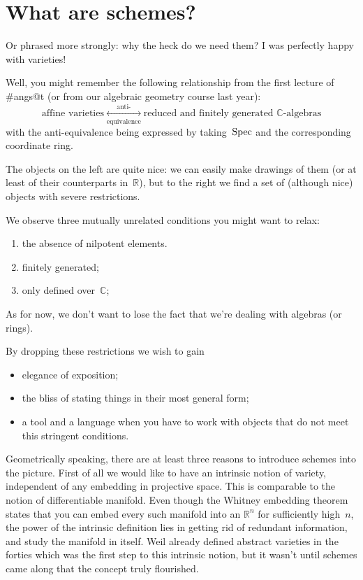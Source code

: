 \section{What are schemes?}

Or phrased more strongly: why the heck do we need them? I was perfectly happy with varieties!

Well, you might remember the following relationship from the first lecture of \#angs@t (or from our algebraic geometry course last year):
\begin{equation}
  \text{affine varieties} \underset{\text{equivalence}}{\overset{\text{anti-}}{\longleftrightarrow}} \text{reduced and finitely generated $\mathbb{C}$-algebras}
  \label{equation:variety-anti-equivalence}
\end{equation}
with the anti-equivalence being expressed by taking~$\operatorname{Spec}$ and the corresponding coordinate ring.

The objects on the left are quite nice: we can easily make drawings of them (or at least of their counterparts in~$\mathbb{R}$), but to the right we find a set of (although nice) objects with severe restrictions.

We observe three mutually unrelated conditions you might want to relax:
\begin{enumerate}
  \item the absence of nilpotent elements.
  \item finitely generated;
  \item only defined over~$\mathbb{C}$;
\end{enumerate}
As for now, we don't want to lose the fact that we're dealing with algebras (or rings).

By dropping these restrictions we wish to gain
\begin{itemize}
  \item elegance of exposition;
  \item the bliss of stating things in their most general form;
  \item a tool and a language when you have to work with objects that do not meet this stringent conditions.
\end{itemize}

Geometrically speaking, there are at least three reasons to introduce schemes into the picture. First of all we would like to have an intrinsic notion of variety, independent of any embedding in projective space. This is comparable to the notion of differentiable manifold. Even though the Whitney embedding theorem states that you can embed every such manifold into an $\mathbb{R}^{n}$ for sufficiently high~$n$, the power of the intrinsic definition lies in getting rid of redundant information, and study the manifold in itself. Weil already defined abstract varieties in the forties which was the first step to this intrinsic notion, but it wasn't until schemes came along that the concept truly flourished.

